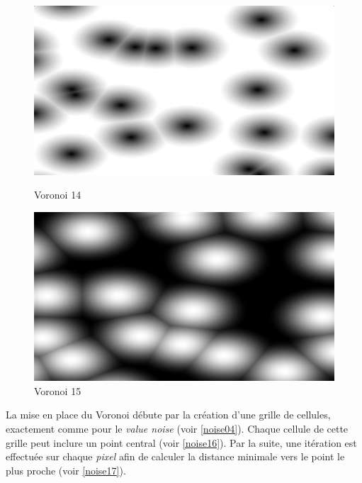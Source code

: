 \begin{figure}[h]
  \begin{minipage}[b]{0.45\linewidth}
    \centering
    \includegraphics[width=\linewidth]{images/noise/noise14.JPG}
    \caption{Voronoi 14}
    \label{noise14}
  \end{minipage}
  \hspace{0.1\linewidth} %
  \begin{minipage}[b]{0.45\linewidth}
    \centering
    \includegraphics[width=\linewidth]{images/noise/noise15.JPG}
    \caption{Voronoi 15}
    \label{noise15}
  \end{minipage}
\end{figure}

La mise en place du Voronoi débute par la création d'une grille de cellules, exactement comme pour le \textit{value noise} (voir \ref{noise04}). Chaque cellule de cette grille peut inclure un point central (voir \ref{noise16}). Par la suite, une itération est effectuée sur chaque \textit{pixel} afin de calculer la distance minimale vers le point le plus proche (voir \ref{noise17}).


